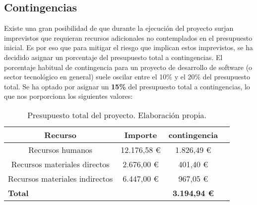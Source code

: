\subsection{Contingencias}
Existe una gran posibilidad de que durante la ejecución del proyecto surjan imprevistos que 
requieran recursos adicionales no contemplados en el presupuesto inicial. Es por eso que 
para mitigar el riesgo que implican estos imprevistos, se ha decidido asignar un porcentaje 
del presupuesto total a contingencias. El porcentaje habitual de contingencia para un proyecto 
de desarrollo de software (o sector tecnológico en general) suele oscilar entre el 10\% y el 20\% 
del presupuesto total. Se ha optado por asignar un \textbf{15\%} del presupuesto total a contingencias, 
lo que nos porporciona los siguientes valores:


\begin{table}[H]
    \begin{center}
    \begin{tabular}{|c|c|c|c|}
        \hline
        \textbf{Recurso} & \textbf{Importe} & \textbf{contingencia} \\ 
        \hline
        Recursos humanos & 12.176,58 € & 1.826,49 € \\
        Recursos materiales directos & 2.676,00 € & 401,40 € \\
        Recursos materiales indirectos  & 6.447,00 € & 967,05 € \\
        \hline
        \multicolumn{2}{|l|}{\textbf{Total}}  & \textbf{3.194,94 €} \\
        \hline
    \end{tabular}
    \caption{Presupuesto total del proyecto. Elaboración propia.}
    \label{tab:calculo_contingencias}
    \end{center}
\end{table}